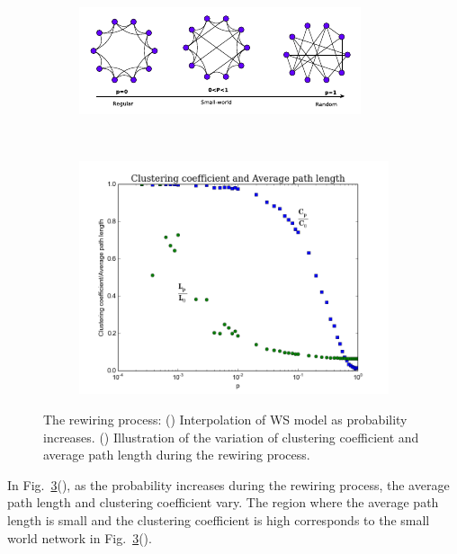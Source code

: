 \documentclass[10pt,a4paper]{article}
\theoremstyle{plain}
\theoremstyle{definition}
\begin{document}
\begin{figure}[!h]
	\centering
	\begin{subfigure}[b]{0.6\textwidth}
		\includegraphics[width=\textwidth]{images/circular-graph.pdf}
		\caption{}
		\label{rewire-fig}
	\end{subfigure}~
	\begin{subfigure}[b]{0.42\textwidth}
		\includegraphics[width=\textwidth]{images/clus-pathlength.png}
		\caption{}
		\label{cluster-average}
	\end{subfigure}
	\caption{The rewiring process: () Interpolation of WS model as probability increases. () Illustration of the variation of clustering coefficient and average path length during the rewiring process. }
	\label{rewire-process}
\end{figure}

In Fig.~\ref{rewire-process}(), as the probability increases during the rewiring process, the average path length and clustering coefficient vary. The region where the average path length is small and the clustering coefficient is high corresponds to the small world network in Fig.~\ref{rewire-process}().
\end{document}
